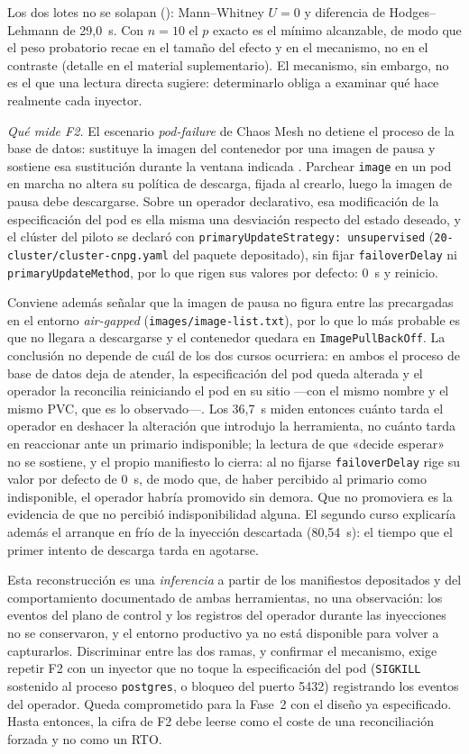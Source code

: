 Los dos lotes no se solapan (): Mann--Whitney $U=0$ y diferencia de Hodges--Lehmann de 29,0~s. Con $n=10$ el $p$ exacto es el mínimo alcanzable, de modo que el peso probatorio recae en el tamaño del efecto y en el mecanismo, no en el contraste (detalle en el material suplementario). El mecanismo, sin embargo, no es el que una lectura directa sugiere: determinarlo obliga a examinar qué hace realmente cada inyector.

\textit{Qué mide F2.} El escenario \textit{pod-failure} de Chaos Mesh no detiene el proceso de la base de datos: sustituye la imagen del contenedor por una imagen de pausa y sostiene esa sustitución durante la ventana indicada \citep{chaosmesh2026}. Parchear \texttt{image} en un pod en marcha no altera su política de descarga, fijada al crearlo, luego la imagen de pausa debe descargarse. Sobre un operador declarativo, esa modificación de la especificación del pod es ella misma una desviación respecto del estado deseado, y el clúster del piloto se declaró con \texttt{primaryUpdateStrategy:\ unsupervised} (\texttt{20-cluster/\allowbreak cluster-cnpg.yaml} del paquete depositado), sin fijar \texttt{failoverDelay} ni \texttt{primaryUpdateMethod}, por lo que rigen sus valores por defecto: 0~s y reinicio.

Conviene además señalar que la imagen de pausa no figura entre las precargadas en el entorno \textit{air-gapped} (\texttt{images/image-list.txt}), por lo que lo más probable es que no llegara a descargarse y el contenedor quedara en \texttt{ImagePullBackOff}. La conclusión no depende de cuál de los dos cursos ocurriera: en ambos el proceso de base de datos deja de atender, la especificación del pod queda alterada y el operador la reconcilia reiniciando el pod en su sitio —con el mismo nombre y el mismo PVC, que es lo observado—. Los 36,7~s miden entonces cuánto tarda el operador en deshacer la alteración que introdujo la herramienta, no cuánto tarda en reaccionar ante un primario indisponible; la lectura de que «decide esperar» no se sostiene, y el propio manifiesto lo cierra: al no fijarse \texttt{failoverDelay} rige su valor por defecto de 0~s, de modo que, de haber percibido al primario como indisponible, el operador habría promovido sin demora. Que no promoviera es la evidencia de que no percibió indisponibilidad alguna. El segundo curso explicaría además el arranque en frío de la inyección descartada (80,54~s): el tiempo que el primer intento de descarga tarda en agotarse.

Esta reconstrucción es una \emph{inferencia} a partir de los manifiestos depositados y del comportamiento documentado de ambas herramientas, no una observación: los eventos del plano de control y los registros del operador durante las inyecciones no se conservaron, y el entorno productivo ya no está disponible para volver a capturarlos. Discriminar entre las dos ramas, y confirmar el mecanismo, exige repetir F2 con un inyector que no toque la especificación del pod  (\texttt{SIGKILL} sostenido al proceso \texttt{postgres}, o bloqueo del puerto 5432) registrando los eventos del operador. Queda comprometido para la Fase~2 con el diseño ya especificado. Hasta entonces, la cifra de F2 debe leerse como el coste de una reconciliación forzada y no como un RTO.

